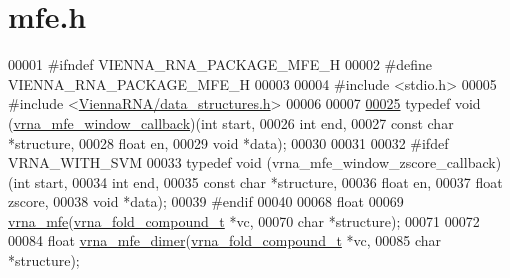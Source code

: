 \hypertarget{mfe_8h_source}{}\section{mfe.\+h}
\label{mfe_8h_source}

\begin{DoxyCode}
00001 \textcolor{preprocessor}{#ifndef VIENNA\_RNA\_PACKAGE\_MFE\_H}
00002 \textcolor{preprocessor}{#define VIENNA\_RNA\_PACKAGE\_MFE\_H}
00003 
00004 \textcolor{preprocessor}{#include <stdio.h>}
00005 \textcolor{preprocessor}{#include <\hyperlink{data__structures_8h}{ViennaRNA/data\_structures.h}>}
00006 
00007 
\hyperlink{group__mfe__fold_ga4f3e5bc214ef803074ace313cb9571b4}{00025} \textcolor{keyword}{typedef} void (\hyperlink{group__mfe__fold_ga4f3e5bc214ef803074ace313cb9571b4}{vrna\_mfe\_window\_callback})(\textcolor{keywordtype}{int}         start,
00026                                         \textcolor{keywordtype}{int}         end,
00027                                         \textcolor{keyword}{const} \textcolor{keywordtype}{char}  *structure,
00028                                         \textcolor{keywordtype}{float}       en,
00029                                         \textcolor{keywordtype}{void}        *data);
00030 
00031 
00032 \textcolor{preprocessor}{#ifdef VRNA\_WITH\_SVM}
00033 \textcolor{keyword}{typedef} void (vrna\_mfe\_window\_zscore\_callback)(\textcolor{keywordtype}{int}        start,
00034                                                \textcolor{keywordtype}{int}        end,
00035                                                \textcolor{keyword}{const} \textcolor{keywordtype}{char} *structure,
00036                                                \textcolor{keywordtype}{float}      en,
00037                                                \textcolor{keywordtype}{float}      zscore,
00038                                                \textcolor{keywordtype}{void}       *data);
00039 \textcolor{preprocessor}{#endif}
00040 
00068 \textcolor{keywordtype}{float}
00069 \hyperlink{group__mfe__fold_gabd3b147371ccf25c577f88bbbaf159fd}{vrna\_mfe}(\hyperlink{group__fold__compound_structvrna__fc__s}{vrna\_fold\_compound\_t} *vc,
00070          \textcolor{keywordtype}{char}                 *structure);
00071 
00072 
00084 \textcolor{keywordtype}{float} \hyperlink{group__mfe__cofold_gaab22d10c1190f205f16a77cab9d5d3ee}{vrna\_mfe\_dimer}(\hyperlink{group__fold__compound_structvrna__fc__s}{vrna\_fold\_compound\_t} *vc,
00085                      \textcolor{keywordtype}{char}                 *structure);

\end{DoxyCode}
